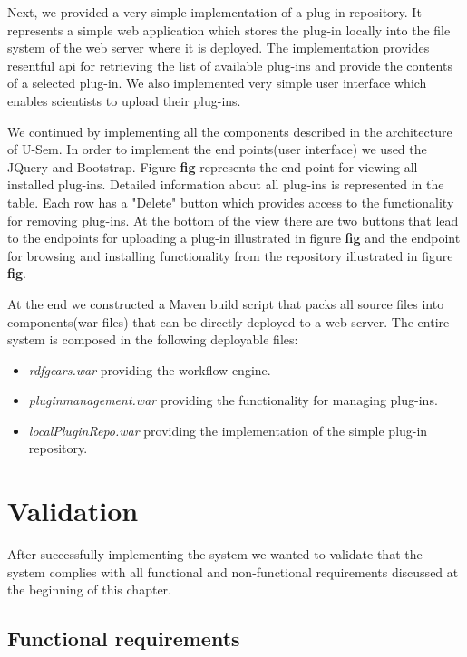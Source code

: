 Next, we provided a very simple implementation of a plug-in repository. It represents a simple web application which stores the plug-in locally into the file system of the web server where it is deployed. The implementation provides resentful api for retrieving the list of available plug-ins and provide the contents of a selected plug-in. We also implemented very simple user interface which enables scientists to upload their plug-ins. 

We continued by implementing all the components described in the architecture of U-Sem. In order to implement the end points(user interface) we used the JQuery and Bootstrap. Figure \textbf{fig} represents the end point for viewing all installed plug-ins. Detailed information about all plug-ins is represented in the table. Each row has a "Delete" button which provides access to the functionality for removing plug-ins. At the bottom of the view there are two buttons that lead to the endpoints for uploading a plug-in illustrated in figure \textbf{fig} and the endpoint for browsing and installing functionality from the repository illustrated in figure \textbf{fig}.

At the end we constructed a Maven build script that packs all source files into components(war files) that can be directly deployed to a web server. The entire system is composed in the following deployable files:
\begin{itemize}
	\item \textit{rdfgears.war} providing the workflow engine.
	\item \textit{pluginmanagement.war} providing the functionality for managing plug-ins.
	\item \textit{localPluginRepo.war} providing the implementation of the simple plug-in repository.
\end{itemize}

\section{Validation}

After successfully implementing the system we wanted to validate that the system complies with all functional and non-functional requirements discussed at the beginning of this chapter. 

\subsection{Functional requirements}

